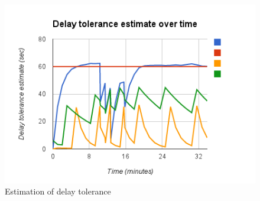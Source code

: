 \documentclass[12pt, fleqn]{article}
\begin{document}
\medskip
\begin{figure}[htp]
\centering
\includegraphics[scale=1.0]{img/dt-vs-time.png}
\caption{Estimation of delay tolerance \label{fig-dt-vs-time}}
\end{figure}
\medskip
\end{document}
